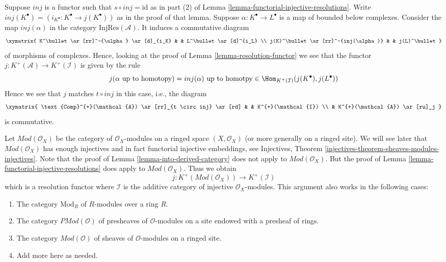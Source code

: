 \begin{remark}
\label{remark-match}
Suppose $inj$ is a functor such that $s \circ inj = \text{id}$
as in part (2) of
Lemma \ref{lemma-functorial-injective-resolutions}.
Write $inj(K^\bullet) = (i_{K^\bullet} : K^\bullet \to j(K^\bullet))$
as in the proof of that lemma.
Suppose $\alpha : K^\bullet \to L^\bullet$ is a map
of bounded below complexes. Consider the map
$inj(\alpha)$ in the category $\text{InjRes}(\mathcal{A})$.
It induces a commutative diagram
$$
\xymatrix{
K^\bullet
\ar[rr]^-{\alpha}
\ar[d]_{i_K} & &
L^\bullet \ar[d]^{i_L} \\
j(K)^\bullet
\ar[rr]^-{inj(\alpha)}
& &
j(L)^\bullet
}
$$
of morphisms of complexes.
Hence, looking at the proof of
Lemma \ref{lemma-resolution-functor}
we see that the functor $j : K^{+}(\mathcal{A}) \to K^{+}(\mathcal{I})$
is given by the rule
$$
j(\alpha\text{ up to homotopy}) = inj(\alpha)\text{ up to homotpy}\in
\Hom_{K^{+}(\mathcal{I})}(j(K^\bullet), j(L^\bullet))
$$
Hence we see that $j$ matches $t \circ inj$ in this case, i.e., the
diagram
$$
\xymatrix{
\text{Comp}^{+}(\mathcal{A}) \ar[rr]_{t \circ inj} \ar[rd] & &
K^{+}(\mathcal{I}) \\
& K^{+}(\mathcal{A}) \ar[ru]_j
}
$$
is commutative.
\end{remark}

\begin{remark}
\label{remark-big-abelian-category}
Let $\textit{Mod}(\mathcal{O}_X)$ be the category of $\mathcal{O}_X$-modules
on a ringed space $(X, \mathcal{O}_X)$ (or more generally on a
ringed site). We will see later that $\textit{Mod}(\mathcal{O}_X)$ has enough
injectives and in fact functorial injective embeddings, see
Injectives, Theorem \ref{injectives-theorem-sheaves-modules-injectives}.
Note that the proof of Lemma \ref{lemma-into-derived-category} does
not apply to $\textit{Mod}(\mathcal{O}_X)$. But the proof of
Lemma \ref{lemma-functorial-injective-resolutions} does apply
to $\textit{Mod}(\mathcal{O}_X)$. Thus we obtain
$$
j : K^{+}(\textit{Mod}(\mathcal{O}_X))
\longrightarrow
K^{+}(\mathcal{I})
$$
which is a resolution functor where $\mathcal{I}$ is the additive
category of injective $\mathcal{O}_X$-modules. This argument also
works in the following cases:
\begin{enumerate}
\item The category $\text{Mod}_R$ of $R$-modules over a ring $R$.
\item The category $\textit{PMod}(\mathcal{O})$ of presheaves of
$\mathcal{O}$-modules on a site endowed with a presheaf of rings.
\item The category $\textit{Mod}(\mathcal{O})$ of sheaves of
$\mathcal{O}$-modules on a ringed site.
\item Add more here as needed.
\end{enumerate}
\end{remark}









